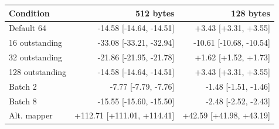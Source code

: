 \begin{tabular}{lrr}
\toprule
Condition & 512 bytes & 128 bytes \\
\midrule
Default 64 & -14.58 [-14.64, -14.51] & +3.43 [+3.31, +3.55] \\
16 outstanding & -33.08 [-33.21, -32.94] & -10.61 [-10.68, -10.54] \\
32 outstanding & -21.86 [-21.95, -21.78] & +1.62 [+1.52, +1.73] \\
128 outstanding & -14.58 [-14.64, -14.51] & +3.43 [+3.31, +3.55] \\
Batch 2 & -7.77 [-7.79, -7.76] & -1.48 [-1.51, -1.46] \\
Batch 8 & -15.55 [-15.60, -15.50] & -2.48 [-2.52, -2.43] \\
Alt. mapper & +112.71 [+111.01, +114.41] & +42.59 [+41.98, +43.19] \\
\bottomrule
\end{tabular}
